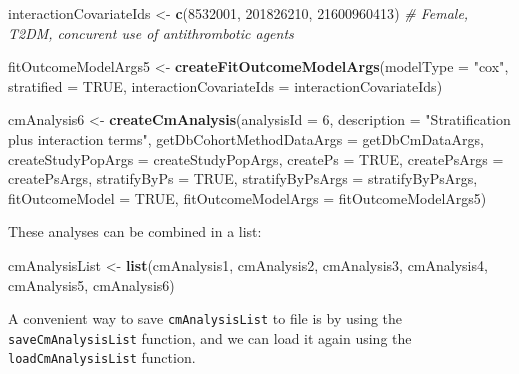 \documentclass[
]{article}
\newenvironment{Shaded}{\begin{snugshade}}{\end{snugshade}}
\newcommand{\CommentTok}[1]{\textcolor[rgb]{0.56,0.35,0.01}{\textit{#1}}}
\newcommand{\DataTypeTok}[1]{\textcolor[rgb]{0.13,0.29,0.53}{#1}}
\newcommand{\DecValTok}[1]{\textcolor[rgb]{0.00,0.00,0.81}{#1}}
\newcommand{\KeywordTok}[1]{\textcolor[rgb]{0.13,0.29,0.53}{\textbf{#1}}}
\newcommand{\NormalTok}[1]{#1}
\newcommand{\OtherTok}[1]{\textcolor[rgb]{0.56,0.35,0.01}{#1}}
\newcommand{\StringTok}[1]{\textcolor[rgb]{0.31,0.60,0.02}{#1}}
\begin{document}
\begin{Shaded}
\begin{Highlighting}[]
\NormalTok{interactionCovariateIds <-}\StringTok{ }\KeywordTok{c}\NormalTok{(}\DecValTok{8532001}\NormalTok{, }\DecValTok{201826210}\NormalTok{, }\DecValTok{21600960413}\NormalTok{) }\CommentTok{# Female, T2DM, concurent use of antithrombotic agents}

\NormalTok{fitOutcomeModelArgs5 <-}\StringTok{ }\KeywordTok{createFitOutcomeModelArgs}\NormalTok{(}\DataTypeTok{modelType =} \StringTok{"cox"}\NormalTok{,}
                                                  \DataTypeTok{stratified =} \OtherTok{TRUE}\NormalTok{,}
                                                  \DataTypeTok{interactionCovariateIds =}\NormalTok{ interactionCovariateIds)}

\NormalTok{cmAnalysis6 <-}\StringTok{ }\KeywordTok{createCmAnalysis}\NormalTok{(}\DataTypeTok{analysisId =} \DecValTok{6}\NormalTok{,}
                                \DataTypeTok{description =} \StringTok{"Stratification plus interaction terms"}\NormalTok{,}
                                \DataTypeTok{getDbCohortMethodDataArgs =}\NormalTok{ getDbCmDataArgs,}
                                \DataTypeTok{createStudyPopArgs =}\NormalTok{ createStudyPopArgs,}
                                \DataTypeTok{createPs =} \OtherTok{TRUE}\NormalTok{,}
                                \DataTypeTok{createPsArgs =}\NormalTok{ createPsArgs,}
                                \DataTypeTok{stratifyByPs =} \OtherTok{TRUE}\NormalTok{,}
                                \DataTypeTok{stratifyByPsArgs =}\NormalTok{ stratifyByPsArgs,}
                                \DataTypeTok{fitOutcomeModel =} \OtherTok{TRUE}\NormalTok{,}
                                \DataTypeTok{fitOutcomeModelArgs =}\NormalTok{ fitOutcomeModelArgs5)}
\end{Highlighting}
\end{Shaded}

These analyses can be combined in a list:

\begin{Shaded}
\begin{Highlighting}[]
\NormalTok{cmAnalysisList <-}\StringTok{ }\KeywordTok{list}\NormalTok{(cmAnalysis1, }
\NormalTok{                       cmAnalysis2, }
\NormalTok{                       cmAnalysis3, }
\NormalTok{                       cmAnalysis4, }
\NormalTok{                       cmAnalysis5, }
\NormalTok{                       cmAnalysis6)}
\end{Highlighting}
\end{Shaded}

A convenient way to save \texttt{cmAnalysisList} to file is by using the
\texttt{saveCmAnalysisList} function, and we can load it again using the
\texttt{loadCmAnalysisList} function.
\end{document}
